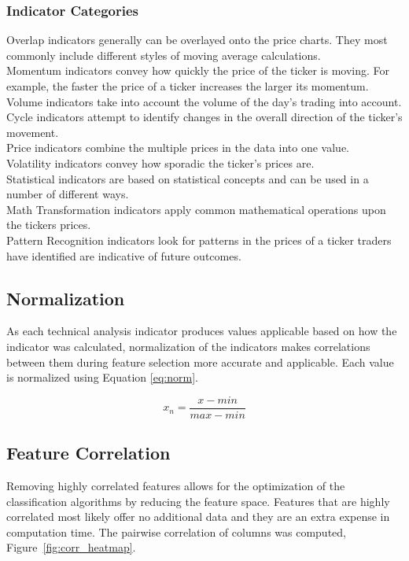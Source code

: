 \documentclass{article}
\begin{document}
\subsubsection{Indicator Categories}
  Overlap indicators generally can be overlayed onto the price charts. They most commonly include different styles of moving average calculations.
\\Momentum indicators convey how quickly the price of the ticker is moving. For example, the faster the price of a ticker increases the larger its momentum.
\\Volume indicators take into account the volume of the day's trading into account. 
\\Cycle indicators attempt to identify changes in the overall direction of the ticker's movement.
\\Price indicators combine the multiple prices in the data into one value.
\\Volatility indicators convey how sporadic the ticker's prices are.
\\Statistical indicators are based on statistical concepts and can be used in a number of different ways.
\\Math Transformation indicators apply common mathematical operations upon the tickers prices.
\\Pattern Recognition indicators look for patterns in the prices of a ticker traders have identified are indicative of future outcomes.

\subsection{Normalization}
As each technical analysis indicator produces values applicable based on how the indicator was calculated, normalization of the indicators makes correlations between them during feature selection more accurate and applicable. Each value is normalized using Equation \eqref{eq:norm}.

\begin{equation}\label{eq:norm}
	x_n = \frac{x - min}{max - min}
\end{equation}

\subsection{Feature Correlation}
Removing highly correlated features allows for the optimization of the classification algorithms by reducing the feature space. Features that are highly correlated most likely offer no additional data and they are an extra expense in computation time. The pairwise correlation of columns was computed, Figure~\ref{fig:corr_heatmap}.
\end{document}
